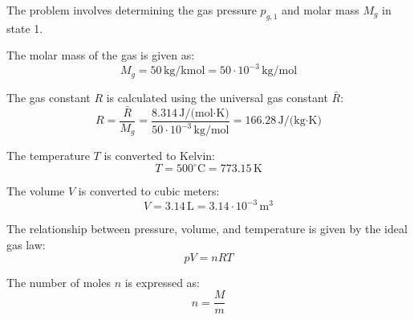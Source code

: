 The problem involves determining the gas pressure \( p_{g,1} \) and molar mass \( M_g \) in state 1.  

The molar mass of the gas is given as:  
\[
M_g = 50 \, \text{kg/kmol} = 50 \cdot 10^{-3} \, \text{kg/mol}
\]  

The gas constant \( R \) is calculated using the universal gas constant \( \bar{R} \):  
\[
R = \frac{\bar{R}}{M_g} = \frac{8.314 \, \text{J/(mol·K)}}{50 \cdot 10^{-3} \, \text{kg/mol}} = 166.28 \, \text{J/(kg·K)}
\]  

The temperature \( T \) is converted to Kelvin:  
\[
T = 500^\circ\text{C} = 773.15 \, \text{K}
\]  

The volume \( V \) is converted to cubic meters:  
\[
V = 3.14 \, \text{L} = 3.14 \cdot 10^{-3} \, \text{m}^3
\]  

The relationship between pressure, volume, and temperature is given by the ideal gas law:  
\[
pV = nRT
\]  

The number of moles \( n \) is expressed as:  
\[
n = \frac{M}{m}
\]